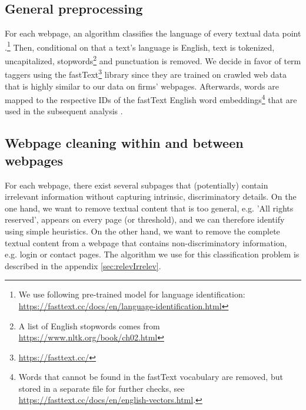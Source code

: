 \documentclass[12pt]{article}
\begin{document}
\subsection{General preprocessing}
For each webpage, an algorithm classifies the language of every textual data point \citep{Joulin2016,Joulin2016a}.\footnote{We use following pre-trained model for language identification: \href{https://fasttext.cc/docs/en/language-identification.html}{https://fasttext.cc/docs/en/language-identification.html}}
Then, conditional on that a text's language is English, text is tokenized, uncapitalized, stopwords\footnote{A list of English stopwords comes from \href{https://www.nltk.org/book/ch02.html}{https://www.nltk.org/book/ch02.html}} and punctuation is removed.
We decide in favor of term taggers using the fastText\footnote{\href{https://fasttext.cc/}{https://fasttext.cc/}} library since they are trained on crawled web data that is highly similar to our data on firms' webpages.
Afterwards, words are mapped to the respective IDs of the fastText English word embeddings\footnote{Words that cannot be found in the fastText vocabulary are removed, but stored in a separate file for further checks, see \href{https://fasttext.cc/docs/en/english-vectors.html}{https://fasttext.cc/docs/en/english-vectors.html}.} that are used in the subsequent analysis \citep{Mikolov2018}.


\subsection{Webpage cleaning within and between webpages}
\label{sec:webpageCleaning}
For each webpage, there exist several subpages that (potentially) contain irrelevant information without capturing intrinsic, discriminatory details.
On the one hand, we want to remove textual content that is too general, e.g. 'All rights reserved', appears on every page (or threshold), and we can therefore identify using simple heuristics.
On the other hand, we want to remove the complete textual content from a webpage that contains non-discriminatory information, e.g. login or contact pages.
The algorithm we use for this classification problem is described in the appendix \eqref{sec:relevIrrelev}.
\end{document}
